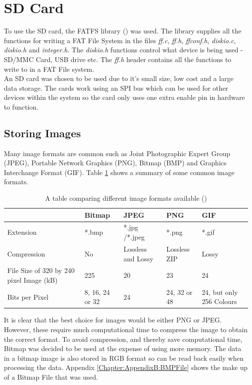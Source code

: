 \section{SD Card} 
To use the SD card, the FATFS library (\cite{FATFS}) was used. The library supplies all the functions for writing a FAT File System in the files \textit{ff.c}, \textit{ff.h}, \textit{ffconf.h}, \textit{diskio.c}, \textit{diskio.h} and \textit{integer.h}. The \textit{diskio.h} functions control what device is being used - SD/MMC Card, USB drive etc. The \textit{ff.h} header contains all the functions to write to in a FAT File system. 
\\
An SD card was chosen to be used due to it's small size, low cost and a large data storage. The cards work using an SPI bus which can be used for other devices within the system so the card only uses one extra enable pin in hardware to function. 

\subsection{Storing Images}

Many image formats are common such as Joint Photographic Expert Group (JPEG), Portable Network Graphics (PNG), Bitmap (BMP) and Graphics Interchange Format (GIF). Table \ref{ImageFormats} shows a summary of some common image formats.


\begin{table}
\centering
\begin{tabular}{|p{3cm}| p{3cm}|p{3cm}|p{3cm}|p{3cm}|} \hline
			&	Bitmap 		& 	JPEG			 	&	PNG				& 	GIF \\ \hline
Extension 		& 	*.bmp 		&  	*.jpg /*.jpeg 		& 	*.png				& 	*.gif \\ \hline
Compression 	& 	No 			& 	Lossless  and Lossy		&	Lossless ZIP			&	Lossy	\\\hline
File Size of 320 by 
240 pixel Image (kB) &	225			&	20				&	23				&	24 \\\hline
Bits per Pixel		&	8, 16, 24 or 32	&	24				&	24, 32 or 48 			& 	24, but only 256 Colours \\


\hline
\end{tabular}
\caption{A table comparing different image formats available (\cite{ImageComparison})}
\label{ImageFormats}
\end{table}

It is clear that the best choice for images would be either PNG or JPEG. However, these require much computational time to compress the image to obtain the correct format. To avoid compression, and thereby save computational time, Bitmap was decided to be used at the expense of using more memory. The data in a bitmap image is also stored in RGB format so can be read back easily when processing the data. Appendix \ref{Chapter:AppendixB:BMPFile} shows the make up of a Bitmap File that was used.


